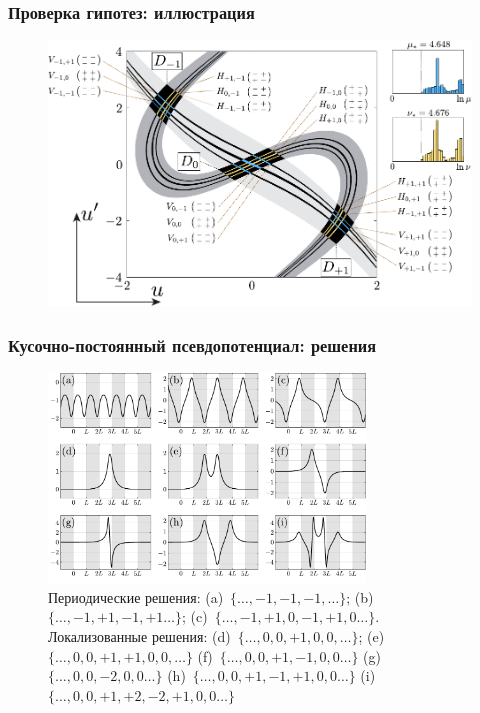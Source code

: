 \documentclass [10pt] {beamer}
\begin{document}
\begin{frame}
	\frametitle{Проверка гипотез: иллюстрация}
	
	\begin{figure}
	\includegraphics[width = 1\textwidth]{pic/hypotheses for piecewise equation.pdf}
	\end{figure}
\end{frame}

\begin{frame}
	\frametitle{Кусочно-постоянный псевдопотенциал: решения}
	\begin{figure}
	\includegraphics[width = 0.75\textwidth]{pic/solutions for piecewise equation.pdf}
	\caption{{\scriptsize
		Периодические решения: (a)~$\{ \dots, -1, -1, -1, \dots \}$; (b)~$\{ \dots, -1, +1, -1, +1 \dots \}$; (c)~$\{ \dots, -1, +1, 0, -1, +1, 0 \dots \}$.
		Локализованные решения: (d)~$\{ \dots, 0, 0, +1, 0, 0, \dots \}$; (e)~$\{ \dots, 0, 0, +1, +1, 0, 0, \dots \}$ (f)~$\{ \dots, 0, 0, +1, -1, 0, 0 \dots \}$ (g)~$\{ \dots, 0, 0, -2, 0, 0 \dots \}$ (h)~$\{ \dots, 0, 0, +1, -1, +1, 0, 0 \dots \}$ (i)~$\{ \dots, 0, 0, +1, +2, -2, +1, 0, 0 \dots \}$
	}}
	\end{figure}
\end{frame}
\end{document}
